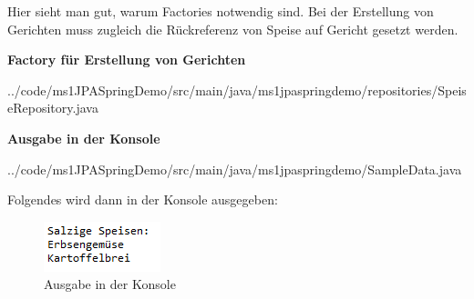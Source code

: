 Hier sieht man gut, warum Factories notwendig sind.
Bei der Erstellung von Gerichten muss zugleich die R\"uckreferenz von
Speise auf Gericht gesetzt werden.

\begin{mdframed}[style=codebox]
\textbf{Factory für Erstellung von Gerichten}

{../code/ms1JPASpringDemo/src/main/java/ms1jpaspringdemo/repositories/SpeiseRepository.java}
\end{mdframed}

\begin{mdframed}[style=codebox]
\textbf{Ausgabe in der Konsole}

{../code/ms1JPASpringDemo/src/main/java/ms1jpaspringdemo/SampleData.java}
\end{mdframed}

Folgendes wird dann in der Konsole ausgegeben:

\begin{figure}[H]
\centering
\includegraphics{ms1/screenshots/console.PNG}
\caption{Ausgabe in der Konsole}
\end{figure}





